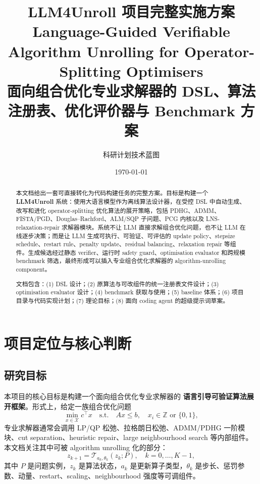 \documentclass[12pt,a4paper]{ctexart}
\title{\textbf{LLM4Unroll 项目完整实施方案}\\[0.35em]
\large Language-Guided Verifiable Algorithm Unrolling for Operator-Splitting Optimisers\\
\large 面向组合优化专业求解器的 DSL、算法注册表、优化评价器与 Benchmark 方案}
\author{科研计划技术蓝图}
\date{\today}
\begin{document}
\maketitle

\begin{abstract}
本文档给出一套可直接转化为代码构建任务的完整方案。目标是构建一个 \textbf{LLM4Unroll} 系统：使用大语言模型作为离线算法设计器，在受控 DSL 中自动生成、改写和进化 operator-splitting 优化算法的展开策略，包括 PDHG、ADMM、FISTA/PGD、Douglas--Rachford、ALM/SQP 子问题、PCG 内核以及 LNS-relaxation-repair 求解器模块。系统不让 LLM 直接求解组合优化问题，也不让 LLM 在线逐步决策；而是让 LLM 生成可执行、可验证、可评估的 update policy、stepsize schedule、restart rule、penalty update、residual balancing、relaxation repair 等组件。生成候选经过静态 verifier、运行时 safety guard、optimisation evaluator 和跨规模 benchmark 筛选，最终形成可以插入专业组合优化求解器的 algorithm-unrolling component。

文档包含：(1) DSL 设计；(2) 原算法与可改组件的统一注册表文件设计；(3) optimisation evaluator 设计；(4) benchmark 获取与使用；(5) baseline 体系；(6) 项目目录与代码实现计划；(7) 理论目标；(8) 面向 coding agent 的超级提示词草案。
\end{abstract}

\tableofcontents
\newpage

\section{项目定位与核心判断}

\subsection{研究目标}
本项目的核心目标是构建一个面向组合优化专业求解器的 \textbf{语言引导可验证算法展开框架}。形式上，给定一族组合优化问题
\begin{equation}
    \min_{x \in \mathcal{X}} c^\top x \quad \text{s.t.}\quad A x \le b, \quad x_i \in \mathbb{Z}\text{ or }\{0,1\},
\end{equation}
专业求解器通常会调用 LP/QP 松弛、拉格朗日松弛、ADMM/PDHG 一阶模块、cut separation、heuristic repair、large neighbourhood search 等内部组件。本文档关注其中可被 algorithm unrolling 化的部分：
\begin{equation}
    z_{k+1}=\mathcal{T}_{a_k,\theta_k}(z_k;P), \quad k=0,\ldots,K-1,
\end{equation}
其中 $P$ 是问题实例，$z_k$ 是算法状态，$a_k$ 是更新算子类型，$\theta_k$ 是步长、惩罚参数、动量、restart、scaling、neighbourhood 强度等可调组件。
\end{document}
